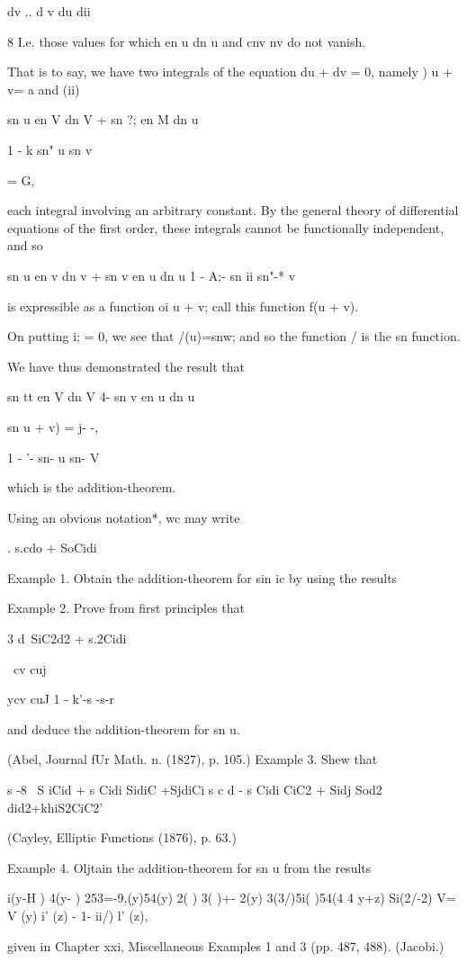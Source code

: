 dv .. d v du dii

8 I.e. those values for which en u dn u and cnv nv do not vanish.

%
%

That is to say, we have two integrals of the equation du + dv = 0,
namely ) u + v= a and (ii)

sn u en V dn V + sn ?; en M dn u

1 - k sn" u sn v

= G,

each integral involving an arbitrary constant. By the general theory
of differential equations of the first order, these integrals cannot
be functionally independent, and so

sn u en v dn v + sn v en u dn u 1 - A;- sn ii sn"-* v

is expressible as a function oi u + v; call this function f(u + v).

On putting i; = 0, we see that /(u)=snw; and so the function / is the
sn function.

We have thus demonstrated the result that

sn tt en V dn V 4- sn v en u dn u

sn u + v) = j- -,

1 - '- sn- u sn- V

which is the addition-theorem.

Using an obvious notation*, wc may write

. s.cdo + SoCidi

Example 1. Obtain the addition-theorem for sin ic by using the results

Example 2. Prove from first principles that

3 d\ SiC2d2 + s.2Cidi\

\ cv cuj

ycv cuJ 1 - k'-s -s-r

and deduce the addition-theorem for sn u.

(Abel, Journal fUr Math. n. (1827), p. 105.) Example 3. Shew that

s -8 \ S iCid + s Cidi SidiC +SjdiCi s c d - s Cidi CiC2 + Sidj Sod2
did2+khiS2CiC2'

(Cayley, Elliptic Functions (1876), p. 63.)

Example 4. Oljtain the addition-theorem for sn u from the results

 i(y-H ) 4(y- ) 253=-9,(y)54(y) 2( ) 3( )+- 2(y) 3(3/)5i( )54(4 4 y+z)
Si(2/-2) V= V (y) i' (z) - 1- ii/) l' (z),

given in Chapter xxi, Miscellaneous Examples 1 and 3 (pp. 487, 488).
(Jacobi.)

